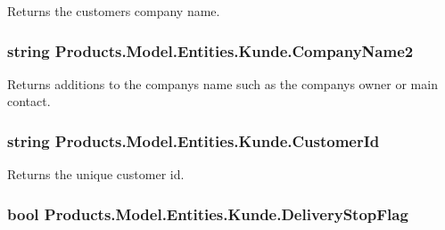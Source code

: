 Returns the customer\textquotesingle{}s company name. 

\subsubsection[{\texorpdfstring{Company\+Name2}{CompanyName2}}]{\setlength{\rightskip}{0pt plus 5cm}string Products.\+Model.\+Entities.\+Kunde.\+Company\+Name2\hspace{0.3cm}{\ttfamily [get]}}\hypertarget{class_products_1_1_model_1_1_entities_1_1_kunde_abfef74db2b09623886e19efc336544b0}{}\label{class_products_1_1_model_1_1_entities_1_1_kunde_abfef74db2b09623886e19efc336544b0}


Returns additions to the company\textquotesingle{}s name such as the company\textquotesingle{}s owner or main contact. 

\subsubsection[{\texorpdfstring{Customer\+Id}{CustomerId}}]{\setlength{\rightskip}{0pt plus 5cm}string Products.\+Model.\+Entities.\+Kunde.\+Customer\+Id\hspace{0.3cm}{\ttfamily [get]}}\hypertarget{class_products_1_1_model_1_1_entities_1_1_kunde_adca937e3f597498ed82e5820c6b3334e}{}\label{class_products_1_1_model_1_1_entities_1_1_kunde_adca937e3f597498ed82e5820c6b3334e}


Returns the unique customer id. 

\subsubsection[{\texorpdfstring{Delivery\+Stop\+Flag}{DeliveryStopFlag}}]{\setlength{\rightskip}{0pt plus 5cm}bool Products.\+Model.\+Entities.\+Kunde.\+Delivery\+Stop\+Flag\hspace{0.3cm}{\ttfamily [get]}}\hypertarget{class_products_1_1_model_1_1_entities_1_1_kunde_a9d82256754c5ad73ebe3b8e806535538}{}\label{class_products_1_1_model_1_1_entities_1_1_kunde_a9d82256754c5ad73ebe3b8e806535538}



